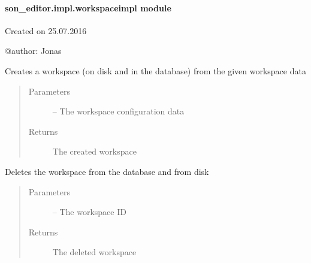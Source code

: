 \documentclass[letterpaper,10pt,english]{sphinxmanual}
\begin{document}
\paragraph{son\_editor.impl.workspaceimpl module}
\label{_source/son_editor.impl:module-son_editor.impl.workspaceimpl}\label{_source/son_editor.impl:son-editor-impl-workspaceimpl-module}
Created on 25.07.2016

@author: Jonas

\begin{fulllineitems}
\label{_source/son_editor.impl:son_editor.impl.workspaceimpl.create_token_file}
\end{fulllineitems}


\begin{fulllineitems}
\label{_source/son_editor.impl:son_editor.impl.workspaceimpl.create_workspace}
Creates a workspace (on disk and in the database) from the given workspace data
\begin{quote}\begin{description}
\item[{Parameters}] \leavevmode
{} -- The workspace configuration data

\item[{Returns}] \leavevmode
The created workspace

\end{description}\end{quote}

\end{fulllineitems}


\begin{fulllineitems}
\label{_source/son_editor.impl:son_editor.impl.workspaceimpl.delete_workspace}
Deletes the workspace from the database and from disk
\begin{quote}\begin{description}
\item[{Parameters}] \leavevmode
{} -- The workspace ID

\item[{Returns}] \leavevmode
The deleted workspace

\end{description}\end{quote}

\end{fulllineitems}
\end{document}
